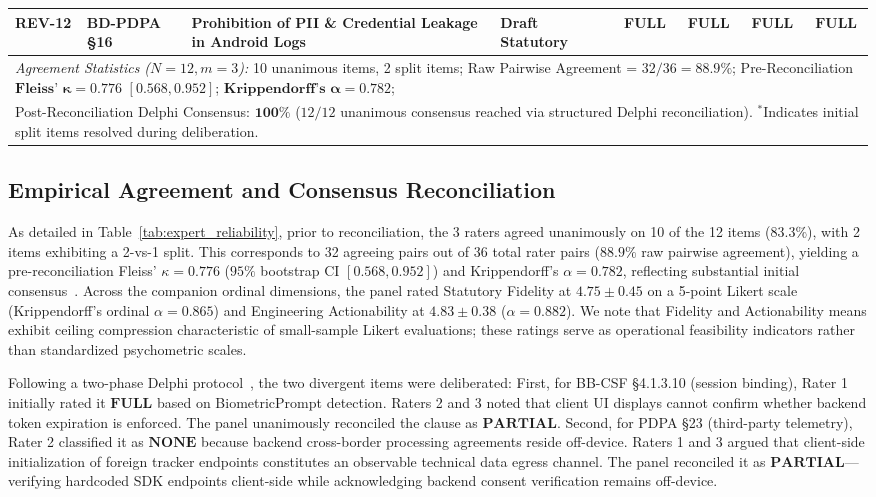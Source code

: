 \begin{table}[t]
{\begin{tabular}{llllcccc}
REV-12 & BD-PDPA §16 & Prohibition of PII \& Credential Leakage in Android Logs & Draft Statutory & FULL & FULL & FULL & $\mathbf{FULL}$ \\
\midrule
\multicolumn{8}{l}{\textit{Agreement Statistics ($N=12, m=3$):} 10 unanimous items, 2 split items; Raw Pairwise Agreement = $32/36 = \mathbf{88.9\%}$; Pre-Reconciliation $\mathbf{\text{Fleiss' } \kappa = 0.776}$ $[0.568, 0.952]$; $\mathbf{\text{Krippendorff's } \alpha = 0.782}$;} \\
\multicolumn{8}{l}{Post-Reconciliation Delphi Consensus: $\mathbf{100\%}$ ($12/12$ unanimous consensus reached via structured Delphi reconciliation). $^*$Indicates initial split items resolved during deliberation.} \\
\bottomrule
\end{tabular}%
}
\end{table}

\subsection{Empirical Agreement and Consensus Reconciliation}
\label{sec:expert:results}

As detailed in Table~\ref{tab:expert_reliability}, prior to reconciliation, the 3 raters agreed unanimously on 10 of the 12 items ($83.3\%$), with 2 items exhibiting a 2-vs-1 split. This corresponds to 32 agreeing pairs out of 36 total rater pairs ($88.9\%$ raw pairwise agreement), yielding a pre-reconciliation Fleiss' $\kappa = 0.776$ ($95\%$ bootstrap CI $[0.568, 0.952]$) and Krippendorff's $\alpha = 0.782$, reflecting substantial initial consensus~\cite{landis_koch_1977}. Across the companion ordinal dimensions, the panel rated Statutory Fidelity at $4.75 \pm 0.45$ on a 5-point Likert scale (Krippendorff's ordinal $\alpha = 0.865$) and Engineering Actionability at $4.83 \pm 0.38$ ($\alpha = 0.882$). We note that Fidelity and Actionability means exhibit ceiling compression characteristic of small-sample Likert evaluations; these ratings serve as operational feasibility indicators rather than standardized psychometric scales.

Following a two-phase Delphi protocol~\cite{delphi_method}, the two divergent items were deliberated:
First, for BB-CSF §4.1.3.10 (session binding), Rater 1 initially rated it $\mathbf{FULL}$ based on BiometricPrompt detection. Raters 2 and 3 noted that client UI displays cannot confirm whether backend token expiration is enforced. The panel unanimously reconciled the clause as $\mathbf{PARTIAL}$.
Second, for PDPA §23 (third-party telemetry), Rater 2 classified it as $\mathbf{NONE}$ because backend cross-border processing agreements reside off-device. Raters 1 and 3 argued that client-side initialization of foreign tracker endpoints constitutes an observable technical data egress channel. The panel reconciled it as $\mathbf{PARTIAL}$—verifying hardcoded SDK endpoints client-side while acknowledging backend consent verification remains off-device.

